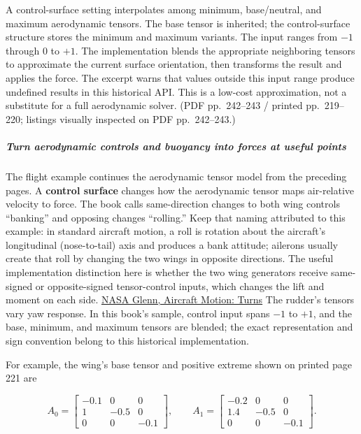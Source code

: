 A control-surface setting interpolates among minimum, base/neutral, and maximum aerodynamic tensors. The base tensor is inherited; the control-surface structure stores the minimum and maximum variants. The input ranges from \(-1\) through \(0\) to \(+1\). The implementation blends the appropriate neighboring tensors to approximate the current surface orientation, then transforms the result and applies the force. The excerpt warns that values outside this input range produce undefined results in this historical API. This is a low-cost approximation, not a substitute for a full aerodynamic solver. (PDF pp.~242--243 / printed pp.~219--220; listings visually inspected on PDF pp.~242--243.)

\subparagraph{Turn aerodynamic controls and buoyancy into forces at useful points}\label{06-engine-ii-ch033-turn-aerodynamic-controls-and-buoyancy-into-forces-at-useful-points}

The flight example continues the aerodynamic tensor model from the preceding pages. A \textbf{control surface} changes how the aerodynamic tensor maps air-relative velocity to force. The book calls same-direction changes to both wing controls ``banking'' and opposing changes ``rolling.'' Keep that naming attributed to this example: in standard aircraft motion, a roll is rotation about the aircraft's longitudinal (nose-to-tail) axis and produces a bank attitude; ailerons usually create that roll by changing the two wings in opposite directions. The useful implementation distinction here is whether the two wing generators receive same-signed or opposite-signed tensor-control inputs, which changes the lift and moment on each side. \href{https://www1.grc.nasa.gov/beginners-guide-to-aeronautics/aircraft-motion-turns/}{NASA Glenn, Aircraft Motion: Turns} The rudder's tensors vary yaw response. In this book's sample, control input spans \(-1\) to \(+1\), and the base, minimum, and maximum tensors are blended; the exact representation and sign convention belong to this historical implementation.

For example, the wing's base tensor and positive extreme shown on printed page 221 are

\[
A_0=\begin{bmatrix}-0.1&0&0\\1&-0.5&0\\0&0&-0.1\end{bmatrix},\qquad
A_1=\begin{bmatrix}-0.2&0&0\\1.4&-0.5&0\\0&0&-0.1\end{bmatrix}.
\]

